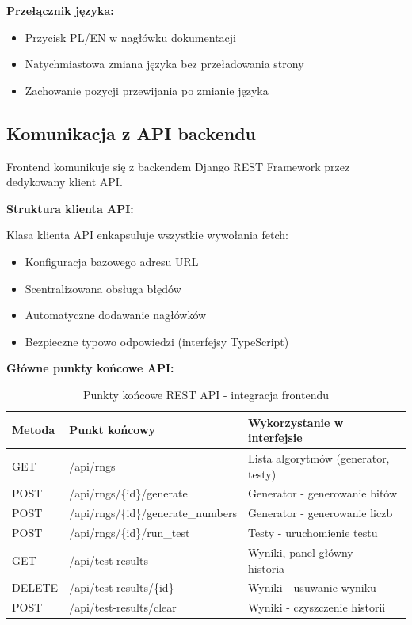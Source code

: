 \documentclass[12pt,a4paper]{article}
\begin{document}
\textbf{Przełącznik języka:}
\begin{itemize}
    \item Przycisk PL/EN w nagłówku dokumentacji
    \item Natychmiastowa zmiana języka bez przeładowania strony
    \item Zachowanie pozycji przewijania po zmianie języka
\end{itemize}

\subsection{Komunikacja z API backendu}

Frontend komunikuje się z backendem Django REST Framework przez dedykowany klient API.

\textbf{Struktura klienta API:}

Klasa klienta API enkapsuluje wszystkie wywołania fetch:
\begin{itemize}
    \item Konfiguracja bazowego adresu URL
    \item Scentralizowana obsługa błędów
    \item Automatyczne dodawanie nagłówków
    \item Bezpieczne typowo odpowiedzi (interfejsy TypeScript)
\end{itemize}

\textbf{Główne punkty końcowe API:}

\begin{table}[H]
\centering
\caption{Punkty końcowe REST API - integracja frontendu}
\begin{tabular}{|l|l|p{5cm}|}
\hline
\textbf{Metoda} & \textbf{Punkt końcowy} & \textbf{Wykorzystanie w interfejsie} \\ \hline
GET & /api/rngs & Lista algorytmów (generator, testy) \\ \hline
POST & /api/rngs/\{id\}/generate & Generator - generowanie bitów \\ \hline
POST & /api/rngs/\{id\}/generate\_numbers & Generator - generowanie liczb \\ \hline
POST & /api/rngs/\{id\}/run\_test & Testy - uruchomienie testu \\ \hline
GET & /api/test-results & Wyniki, panel główny - historia \\ \hline
DELETE & /api/test-results/\{id\} & Wyniki - usuwanie wyniku \\ \hline
POST & /api/test-results/clear & Wyniki - czyszczenie historii \\ \hline
\end{tabular}
\end{table}
\end{document}
